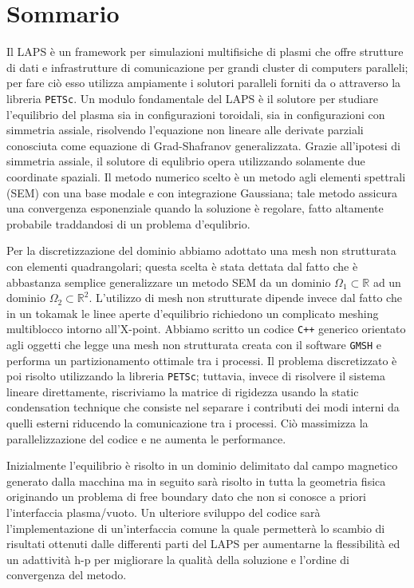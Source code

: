 \chapter*{Sommario}
Il LAPS \`{e} un framework per simulazioni multifisiche di plasmi che offre strutture di dati e infrastrutture di comunicazione per grandi cluster di computers paralleli; per fare ci\`{o} esso utilizza ampiamente i solutori paralleli forniti da o attraverso la libreria \verb|PETSc|. Un modulo fondamentale del LAPS \`{e} il solutore per studiare l'equilibrio del plasma sia in configurazioni toroidali, sia in configurazioni con simmetria assiale, risolvendo l'equazione non lineare alle derivate parziali conosciuta come equazione di Grad-Shafranov generalizzata. Grazie all'ipotesi di simmetria assiale, il solutore di equlibrio opera utilizzando solamente due coordinate spaziali. Il metodo numerico scelto \`{e} un metodo agli elementi spettrali (SEM) con una base modale e con integrazione Gaussiana; tale metodo assicura una convergenza esponenziale quando la soluzione \`{e} regolare, fatto altamente probabile traddandosi di un problema d'equlibrio.

Per la discretizzazione del dominio abbiamo adottato una mesh non strutturata con elementi quadrangolari; questa scelta \`{e} stata dettata dal fatto che \`{e} abbastanza semplice generalizzare un metodo SEM da un dominio $\Omega_1\subset\mathbb{R}$ ad un dominio $\Omega_2\subset\mathbb{R}^2$. L'utilizzo di mesh non strutturate dipende invece dal fatto che in un tokamak le linee aperte d'equilibrio richiedono un complicato meshing multiblocco intorno all'X-point. Abbiamo scritto un codice \verb|C++| generico orientato agli oggetti che legge una mesh non strutturata creata con il software \verb|GMSH| e performa un partizionamento ottimale tra i processi. Il problema discretizzato \`{e} poi risolto utilizzando la libreria \verb|PETSc|; tuttavia, invece di risolvere il sistema lineare direttamente, riscriviamo la matrice di rigidezza usando la static condensation technique che consiste nel separare i contributi dei modi interni da quelli esterni riducendo la comunicazione tra i processi. Ci\`{o} massimizza la parallelizzazione del codice e ne aumenta le performance.

Inizialmente l'equilibrio \`{e} risolto in un dominio delimitato dal campo magnetico generato dalla macchina ma in seguito sar\`{a} risolto in tutta la geometria fisica originando un problema di free boundary dato che non si conosce a priori l'interfaccia plasma/vuoto. Un ulteriore sviluppo del codice sar\`{a} l'implementazione di un'interfaccia comune la quale permetter\`{a} lo scambio di risultati ottenuti dalle differenti parti del LAPS per aumentarne la flessibilit\`{a} ed un adattivit\`{a} h-p per migliorare la qualit\`{a} della soluzione e l'ordine di convergenza del metodo.
